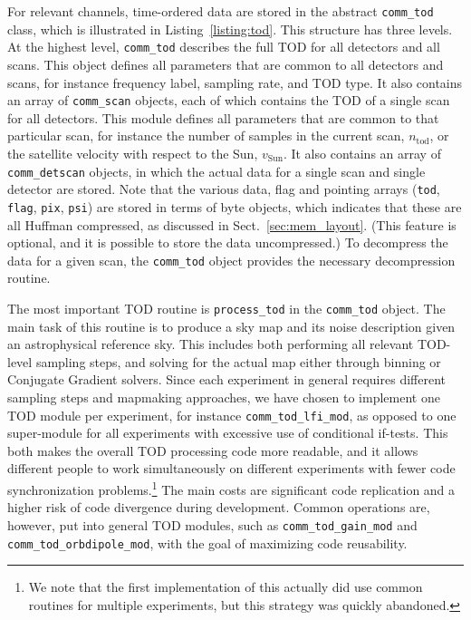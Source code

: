 \documentclass[twocolumn]{aa}
\begin{document}
For relevant channels, time-ordered data are stored in the abstract
\texttt{comm\_tod} class, which is illustrated in
Listing~\ref{listing:tod}. This structure has three levels. At the
highest level, \texttt{comm\_tod} describes the full TOD for all
detectors and all scans. This object defines all parameters that are
common to all detectors and scans, for instance frequency label,
sampling rate, and TOD type. It also contains an array of
\texttt{comm\_scan} objects, each of which contains the TOD of a
single scan for all detectors. This module defines all parameters that
are common to that particular scan, for instance the number of samples
in the current scan, $n_{\mathrm{tod}}$, or the satellite velocity
with respect to the Sun, $v_{\mathrm{Sun}}$. It also contains an array
of \texttt{comm\_detscan} objects, in which the actual data for a
single scan and single detector are stored. Note that the various
data, flag and pointing arrays (\texttt{tod}, \texttt{flag},
\texttt{pix}, \texttt{psi}) are stored in terms of byte objects, which
indicates that these are all Huffman compressed, as discussed in
Sect.~\ref{sec:mem_layout}. (This feature is optional, and it is
possible to store the data uncompressed.) To decompress the data for a
given scan, the \texttt{comm\_tod} object provides the necessary
decompression routine.

The most important TOD routine is \texttt{process\_tod} in the
\texttt{comm\_tod} object. The main task of this routine is to produce
a sky map and its noise description given an astrophysical reference
sky. This includes both performing all relevant TOD-level sampling
steps, and solving for the actual map either through binning or
Conjugate Gradient solvers. Since each experiment in general requires
different sampling steps and mapmaking approaches, we have chosen to
implement one TOD module per experiment, for instance
\texttt{comm\_tod\_lfi\_mod}, as opposed to one super-module for all
experiments with excessive use of conditional if-tests. This both
makes the overall TOD processing code more readable, and it allows
different people to work simultaneously on different experiments with
fewer code synchronization problems.\footnote{We note that the first
  implementation of this actually did use common routines for multiple
  experiments, but this strategy was quickly abandoned.} The main
costs are significant code replication and a higher risk of code
divergence during development. Common operations are, however, put
into general TOD modules, such as \texttt{comm\_tod\_gain\_mod} and
\texttt{comm\_tod\_orbdipole\_mod}, with the goal of maximizing code
reusability. 
\end{document}
